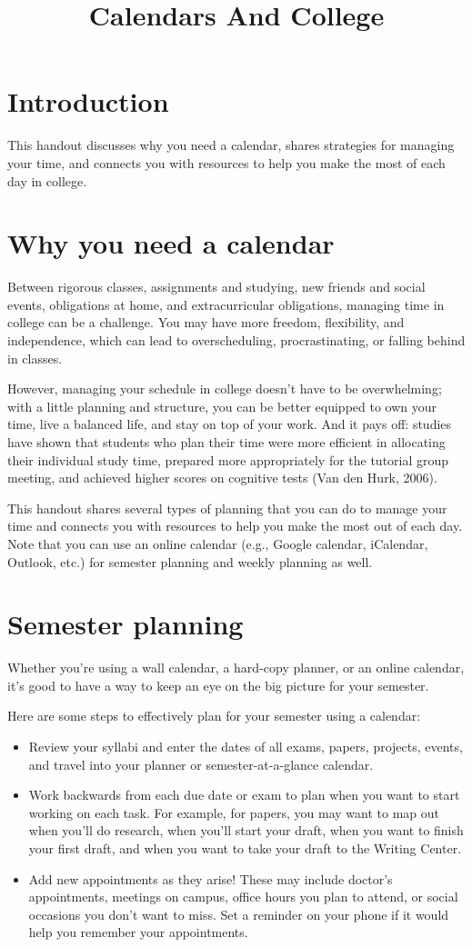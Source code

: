 \documentclass[../main.tex]{subfiles}
\title{Calendars And College}
\begin{document}
\maketitle
%
\section{Introduction}
This handout discusses why you need a calendar, shares strategies for managing
your time, and connects you with resources to help you make the most of each day
in college.
%
\section{Why you need a calendar}
Between rigorous classes, assignments and studying, new friends and social
events, obligations at home, and extracurricular obligations, managing time in
college can be a challenge. You may have more freedom, flexibility, and
independence, which can lead to overscheduling, procrastinating, or falling
behind in classes.

However, managing your schedule in college doesn’t have to be overwhelming; with
a little planning and structure, you can be better equipped to own your time,
live a balanced life, and stay on top of your work. And it pays off: studies
have shown that students who plan their time were more efficient in allocating
their individual study time, prepared more appropriately for the tutorial group
meeting, and achieved higher scores on cognitive tests (Van den Hurk, 2006).

This handout shares several types of planning that you can do to manage your
time and connects you with resources to help you make the most out of each day.
Note that you can use an online calendar (e.g., Google calendar, iCalendar,
Outlook, etc.) for semester planning and weekly planning as well.
%
\section{Semester planning}
Whether you’re using a wall calendar, a hard-copy planner, or an online
calendar, it’s good to have a way to keep an eye on the big picture for your
semester.

Here are some steps to effectively plan for your semester using a calendar:
\begin{itemize}
  \item Review your syllabi and enter the dates of all exams, papers, projects,
    events, and travel into your planner or semester-at-a-glance calendar.
  \item Work backwards from each due date or exam to plan when you want to start
    working on each task. For example, for papers, you may want to map out when
    you’ll do research, when you’ll start your draft, when you want to finish
    your first draft, and when you want to take your draft to the Writing
    Center.
  \item Add new appointments as they arise! These may include doctor’s
    appointments, meetings on campus, office hours you plan to attend, or social
    occasions you don’t want to miss. Set a reminder on your phone if it would
    help you remember your appointments.
\end{itemize}
%
\end{document}
